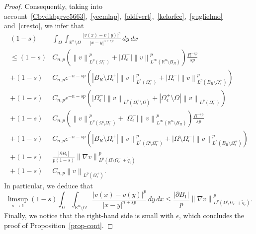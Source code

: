 \documentclass[12pt]{article}
\newcommand{\R}{\mathbb{R}}
\numberwithin{equation}{section}
\renewcommand{\leq}{\leqslant}
\begin{document}
\begin{appendix}
\begin{proof}
Consequently, taking into account~\eqref{Cbvdkbgrvc5663},~\eqref{yecmlap},~\eqref{oldfvert},~\eqref{kelorfce},~\eqref{guglielmo}
and~\eqref{cresto}, we infer that 
\begin{equation*}
\begin{split}
(1-s)&\int_{\Omega}\int_{\R^n\setminus \Omega} \frac{\left|v(x)-v(y)\right|^p}{\left|x-y\right|^{n+sp}}\,dy\,dx\\ 
\leq (1-s) & C_{n,p}\left(\left\|v\right\|_{L^p(\Omega_{\epsilon}^-)}^p+\left|\Omega_{\epsilon}^-\right|\left\|v\right\|_{L^\infty(\R^n\setminus B_R)}^p\right)\frac{R^{-sp}}{sp}\\
+(1-s)& C_{n,p} \epsilon^{-n-sp} \left(\left|B_R\setminus \Omega_{\epsilon}^{+}\right|\left\|v\right\|_{L^p(\Omega_{\epsilon}^-)}^p+\left|\Omega_{\epsilon}^-\right|\left\|v\right\|_{L^p(B_R\setminus \Omega_{\epsilon}^+)}^p\right)\\
+(1-s) &C_{n,p}\epsilon^{-n-sp}\left(\left|\Omega_{\epsilon}^-\right|\left\|v\right\|_{L^p(\Omega_{\epsilon}^+\setminus \Omega)}+\left|\Omega_{\epsilon}^+\setminus \Omega\right|\left\|v\right\|_{L^p(\Omega_{\epsilon}^-)}                 \right)\\
+(1-s)& C_{n,p}\left(\left\|v\right\|_{L^p(\Omega\setminus \Omega_{\epsilon}^-)}^p+\left|\Omega_{\epsilon}^-\right|\left\|v\right\|_{L^\infty(\R^n\setminus B_R)}^p\right)\frac{R^{-sp}}{sp}\\
+(1-s)& C_{n,p} \epsilon^{-n-sp} \left(\left|B_R\setminus \Omega_{\epsilon}^{+}\right|\left\|v\right\|_{L^p(\Omega\setminus \Omega_{\epsilon}^-)}^p+\left|\Omega\setminus \Omega_{\epsilon}^-\right|\left\|v\right\|_{L^p(B_R\setminus \Omega_{\epsilon}^+)}^p\right)\\
+(1-s) & \frac{\left|\partial B_1\right|}{p(1-s)}\left\|\nabla v\right\|_{L^p(\Omega\setminus \Omega_{\epsilon}^{-}+\tilde{q}_\epsilon)}^p\\
+ (1-s) & C_{n,p} \left\|v\right\|_{L^p(\Omega_{\epsilon}^{+})}.
\end{split}
\end{equation*}
In particular, we deduce that 
\begin{equation*}
\limsup_{s\to 1}(1-s)\int_{\Omega}\int_{\R^n\setminus \Omega} \frac{\left|v(x)-v(y)\right|^p}{\left|x-y\right|^{n+sp}}\,dy\,dx\leq  \frac{\left|\partial B_1\right|}{p}\left\|\nabla v\right\|_{L^p(\Omega\setminus \Omega_{\epsilon}^{-}+\tilde{q}_\epsilon)}^p.
\end{equation*}
Finally, we notice that the right-hand side is small with $\epsilon$, which concludes the proof of Proposition~\ref{prop-cont}.
\end{proof}



\end{appendix}
\end{document}

